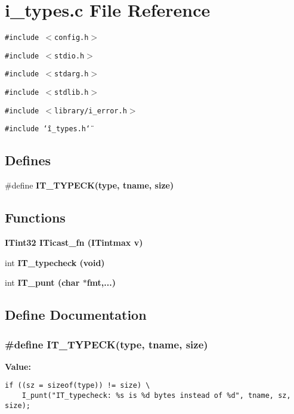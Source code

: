 \section{i\_\-types.c File Reference}
\label{i__types_8c}
{\tt \#include $<$config.h$>$}\par
{\tt \#include $<$stdio.h$>$}\par
{\tt \#include $<$stdarg.h$>$}\par
{\tt \#include $<$stdlib.h$>$}\par
{\tt \#include $<$library/i\_\-error.h$>$}\par
{\tt \#include \char`\"{}i\_\-types.h\char`\"{}}\par
\subsection*{Defines}
\begin{CompactItemize}
\item 
\#define \bf{IT\_\-TYPECK}(type, tname, size)
\end{CompactItemize}
\subsection*{Functions}
\begin{CompactItemize}
\item 
\bf{ITint32} \bf{ITicast\_\-fn} (\bf{ITintmax} v)
\item 
int \bf{IT\_\-typecheck} (void)
\item 
int \bf{IT\_\-punt} (char $\ast$fmt,...)
\end{CompactItemize}


\subsection{Define Documentation}
\subsubsection{\setlength{\rightskip}{0pt plus 5cm}\#define IT\_\-TYPECK(type, tname, size)}\label{i__types_8c_c3cd751263f9104bae4e05419a7832e2}


\textbf{Value:}

\begin{Code}\begin{verbatim}if ((sz = sizeof(type)) != size) \
    I_punt("IT_typecheck: %s is %d bytes instead of %d", tname, sz, size);
\end{verbatim}\end{Code}



